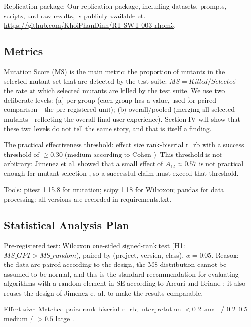 Replication package: Our replication package, including datasets, prompts, scripts, and raw results, is publicly available at: \url{https://github.com/KhoiPhanDinh/RT-SWT-003-nhom3}.

\subsection{Metrics}

Mutation Score (MS) is the main metric: the proportion of mutants in the selected mutant set that are detected by the test suite: $MS = Killed/Selected$ \cite{jimenez2018naturalness} - the rate at which selected mutants are killed by the test suite. We use two deliberate levels: (a) per-group (each group has a value, used for paired comparison - the pre-registered unit); (b) overall/pooled (merging all selected mutants - reflecting the overall final user experience). Section IV will show that these two levels do not tell the same story, and that is itself a finding.

The practical effectiveness threshold: effect size rank-biserial r\_rb with a success threshold of $\geq 0.30$ (medium according to Cohen \cite{cohen1988statistical}). This threshold is not arbitrary: Jimenez et al. showed that a small effect of $A_{12} \approx 0.57$ is not practical enough for mutant selection \cite{jimenez2018naturalness}, so a successful claim must exceed that threshold.

Tools: pitest 1.15.8 \cite{coles2016pit} for mutation; scipy 1.18 for Wilcoxon; pandas for data processing; all versions are recorded in requirements.txt.

\subsection{Statistical Analysis Plan}
Pre-registered test: Wilcoxon one-sided signed-rank test (H1: $MS\_GPT > MS\_random$), paired by (project, version, class), $\alpha = 0.05$. Reason: the data are paired according to the design, the MS distribution cannot be assumed to be normal, and this is the standard recommendation for evaluating algorithms with a random element in SE according to Arcuri and Briand \cite{arcuri2011practical}; it also reuses the design of Jimenez et al. \cite{jimenez2018naturalness} to make the results comparable.

Effect size: Matched-pairs rank-biserial r\_rb; interpretation $<0.2$ small / 0.2–0.5 medium / $>0.5$ large \cite{cohen1988statistical}.

